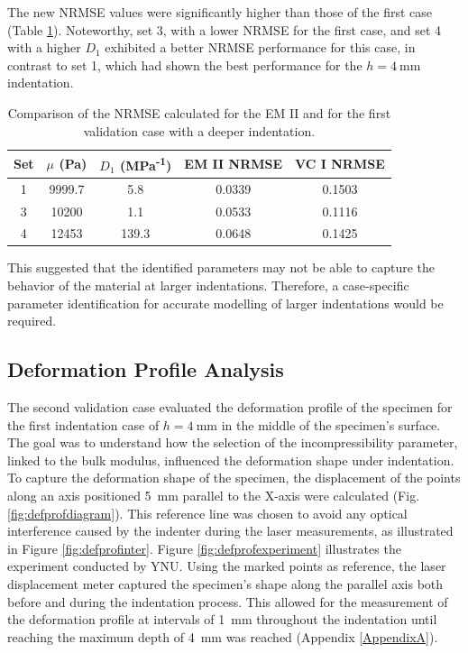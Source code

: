The new NRMSE values were significantly higher than those of the first case (Table \ref{tab:nrmse8mm}). 
Noteworthy, set \SI{3}{}, with a lower NRMSE for the first case, and set \SI{4}{} with a higher $D_1$ 
exhibited a better NRMSE performance for this case, in contrast to set \SI{1}{}, which had shown 
the best performance for the $h=\SI{4}{\milli \meter}$ indentation.\\

\begin{table}[ht!]
    \centering
    \begin{tabular}{|c|c|c|c|c|}
    \hline
    Set & $\mu$ (Pa) & $D_1$ (MPa\textsuperscript{-1}) & EM II NRMSE & VC I NRMSE\\
    \hline
    1 & 9999.7 & 5.8 & 0.0339 & 0.1503\\
    3 & 10200 & 1.1 & 0.0533 & 0.1116\\
    4 & 12453 & 139.3 & 0.0648 & 0.1425\\
    \hline
    \end{tabular}
    \caption[NRMSE for first validation case]{Comparison of the NRMSE calculated for the EM II and for the first validation case with a deeper indentation.}
	\label{tab:nrmse8mm}
\end{table}

This suggested that the identified parameters may not be able to capture the behavior 
of the material at larger indentations. Therefore, a case-specific parameter identification
for accurate modelling of larger indentations would be required.\\

\subsection{Deformation Profile Analysis}
\label{subsection:defprofanalysis}
The second validation case evaluated the deformation profile of the specimen for the first 
indentation case of $h=\SI{4}{\milli \meter}$ in the middle of the specimen's surface. The goal 
was to understand how the selection of the incompressibility parameter, linked to the 
bulk modulus, influenced the deformation shape under indentation.\\

To capture the deformation shape of the specimen, the displacement of the points along an axis positioned 
\SI{5}{\milli \meter} parallel to the X-axis were calculated (Fig. \ref{fig:defprofdiagram}). %
This reference line was chosen to avoid any optical interference caused by the indenter during the 
laser measurements, as illustrated in Figure \ref{fig:defprofinter}.
Figure \ref{fig:defprofexperiment} illustrates the experiment conducted by YNU.
Using the marked points as reference, the laser displacement meter captured the specimen's 
shape along the parallel axis both before and during the indentation process.
This allowed for the measurement of the deformation profile at intervals of \SI{1}{\milli \meter}
throughout the indentation until reaching the maximum depth of \SI{4}{\milli \meter} was reached (Appendix \ref{AppendixA}).\\

